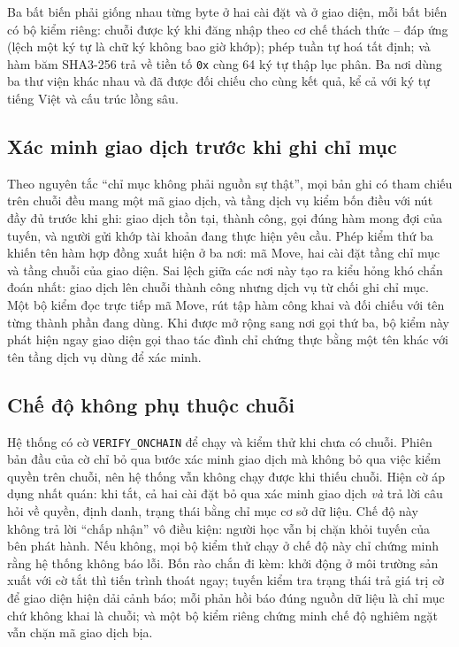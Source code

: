 Ba bất biến phải giống nhau từng byte ở hai cài đặt và ở giao diện, mỗi bất biến có bộ kiểm riêng: chuỗi được ký khi đăng nhập theo cơ chế thách thức -- đáp ứng (lệch một ký tự là chữ ký không bao giờ khớp); phép tuần tự hoá tất định; và hàm băm SHA3-256 trả về tiền tố \texttt{0x} cùng 64 ký tự thập lục phân. Ba nơi dùng ba thư viện khác nhau và đã được đối chiếu cho cùng kết quả, kể cả với ký tự tiếng Việt và cấu trúc lồng sâu.

\subsection{Xác minh giao dịch trước khi ghi chỉ mục}

Theo nguyên tắc ``chỉ mục không phải nguồn sự thật'', mọi bản ghi có tham chiếu trên chuỗi đều mang một mã giao dịch, và tầng dịch vụ kiểm bốn điều với nút đầy đủ trước khi ghi: giao dịch tồn tại, thành công, gọi đúng hàm mong đợi của tuyến, và người gửi khớp tài khoản đang thực hiện yêu cầu. Phép kiểm thứ ba khiến tên hàm hợp đồng xuất hiện ở ba nơi: mã Move, hai cài đặt tầng chỉ mục và tầng chuỗi của giao diện. Sai lệch giữa các nơi này tạo ra kiểu hỏng khó chẩn đoán nhất: giao dịch lên chuỗi thành công nhưng dịch vụ từ chối ghi chỉ mục. Một bộ kiểm đọc trực tiếp mã Move, rút tập hàm công khai và đối chiếu với tên từng thành phần đang dùng. Khi được mở rộng sang nơi gọi thứ ba, bộ kiểm này phát hiện ngay giao diện gọi thao tác đình chỉ chứng thực bằng một tên khác với tên tầng dịch vụ dùng để xác minh.

\subsection{Chế độ không phụ thuộc chuỗi}

Hệ thống có cờ \texttt{VERIFY\_ONCHAIN} để chạy và kiểm thử khi chưa có chuỗi. Phiên bản đầu của cờ chỉ bỏ qua bước xác minh giao dịch mà không bỏ qua việc kiểm quyền trên chuỗi, nên hệ thống vẫn không chạy được khi thiếu chuỗi. Hiện cờ áp dụng nhất quán: khi tắt, cả hai cài đặt bỏ qua xác minh giao dịch \emph{và} trả lời câu hỏi về quyền, định danh, trạng thái bằng chỉ mục cơ sở dữ liệu. Chế độ này không trả lời ``chấp nhận'' vô điều kiện: người học vẫn bị chặn khỏi tuyến của bên phát hành. Nếu không, mọi bộ kiểm thử chạy ở chế độ này chỉ chứng minh rằng hệ thống không báo lỗi. Bốn rào chắn đi kèm: khởi động ở môi trường sản xuất với cờ tắt thì tiến trình thoát ngay; tuyến kiểm tra trạng thái trả giá trị cờ để giao diện hiện dải cảnh báo; mỗi phản hồi báo đúng nguồn dữ liệu là chỉ mục chứ không khai là chuỗi; và một bộ kiểm riêng chứng minh chế độ nghiêm ngặt vẫn chặn mã giao dịch bịa.

